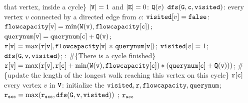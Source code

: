 \begin{algorithm}
\begin{algorithmic}[1]
            that vertex, inside a cycle\}
             $|\mathtt{V}| = 1$ and $|\mathtt{E}| = 0$:
            \STATE {}  $\mathtt{Q}(v)$
             {$\mathtt{dfs(G, c,visited)}$}:
            \STATE {} every vertex $v$ 
            connected by a directed edge from $c$:
            \STATE \qquad {} $\mathtt{visited}[v] = \mathtt{false}$:
            \STATE \qquad \qquad \qquad $\mathtt{flowcapacity[v] = \min(\mathtt{W}(v), {flowcapacity}[c])}$;
            \STATE \qquad \qquad \qquad $\mathtt{querynum[v] = querynum[c] + \mathtt{Q}(v)}$;
            \STATE \qquad \qquad \qquad $\mathtt{r[v] =  \max(r[v], flowcapacity[v] \times querynum[v]}) $; 
            \STATE \qquad \qquad \qquad  $\mathtt{visited}[v] = 1$; %
            \STATE \qquad \qquad \qquad $\mathtt{dfs(G, v, visited)}$;
            \STATE \qquad {}: \#\{There is a cycle finished\}
            \STATE \qquad \qquad \qquad 
            $\mathtt{r[v] =  \max(r[v], r[c] +  \min(\mathtt{W}(v), {flowcapacity}[c]) * (querynum[c] + \mathtt{Q}(v)))}$; \#\{update the length of the longest walk reaching this vertex on this cycle\}
            \STATE {}  $\mathtt{r[c]}$
             every vertex $v$ in $\mathtt{V}$:
            \STATE  \qquad initialize the $\mathtt{visited, r, flowcapacity, querynum}$;
            \STATE  \qquad $\mathtt{r_{scc} = \max(r_{scc}, dfs(G, v, \mathtt{visited} ))}$ ; 
            \RETURN  $\mathtt{r_{scc}}$
            \end{algorithmic}
            \end{algorithm}
